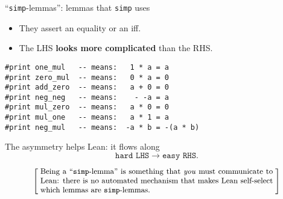 \documentclass{beamer}
\begin{document}
\begin{frame}[fragile]{``{\texttt{simp}}-lemmas'': lemmas that {\texttt{simp}} uses}

\begin{itemize}
\item
  They assert an equality or an iff.
\item
  The LHS {\textbf{looks more complicated}} than the RHS.
\end{itemize}

\begin{verbatim}
#print one_mul   -- means:   1 * a = a
#print zero_mul  -- means:   0 * a = 0
#print add_zero  -- means:   a + 0 = 0
#print neg_neg   -- means:    - -a = a
#print mul_zero  -- means:   a * 0 = 0
#print mul_one   -- means:   a * 1 = a
#print neg_mul   -- means:  -a * b = -(a * b)
\end{verbatim}

The asymmetry helps Lean: it flows along
$${\texttt{hard LHS}} \longrightarrow {\texttt{easy RHS}}.$$

\smallskip
\[
  \left[ \;
  \makebox{\parbox{0.8\textwidth}{\small
  Being a ``{\texttt{simp}}-lemma'' is something that {\emph{you}} must communicate to Lean: there is no automated mechanism that makes Lean self-select which lemmas are {\texttt{simp}}-lemmas.
  }}
  \; \right]
\]
\bigskip
\end{frame}
\end{document}
